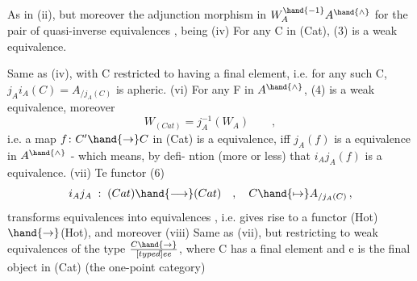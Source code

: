 
 As in (ii), but moreover the adjunction morphism in $W_A^{\hand{-1}}A^{\hand{\wedge}}$ for
the pair of quasi-inverse equivalences , being 
(iv) For any C in (Cat), (3) is a weak equivalence.
 Same as (iv), with C restricted to having a final element, i.e.
for any such C, $j_Ai_A(C) = A_{/j_A(C)}$ is apheric.
(vi) For any F in $A^{\hand{\wedge}}$, (4) is a weak equivalence, moreover
\[ W_{(Cat)} = j_A^{-1}(W_A) \qquad , \]
i.e. a  map $f\colon C' \hand{\to} C$ in (Cat) is a   equivalence,
iff $j_A(f)$ is a   equivalence in $A^{\hand{\wedge}}$ - which means, by defi-%
ntion (more or less) that $i_Aj_A(f)$ is a   equivalence.
(vii) Te functor
(6) \[ i_Aj_A \; : \; (Cat) \hand{\longrightarrow} (Cat) \quad , \quad C \hand{\mapsto} A_{/j_A(C)} \, , \]
transforms   equivalences into   equivalences , i.e.
gives rise to a functor (Hot)$\hand{\to}$(Hot), and moreover  
 
(viii) Same as (vii), but restricting to  weak equivalences of the
type $C \hand{\to} \over[typed]{e}{e}$, where C has a final element and e is the final
object in (Cat) (the one-point category)

